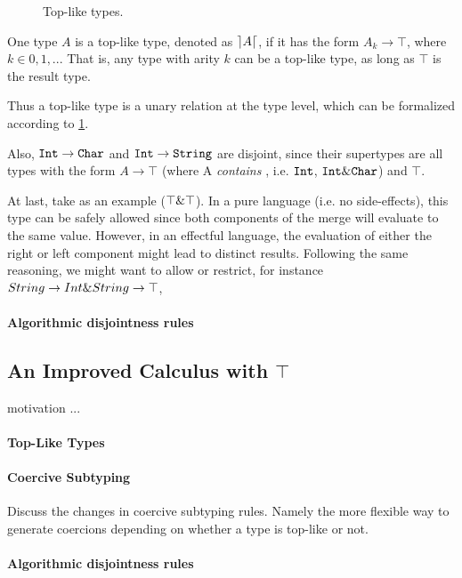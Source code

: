 \begin{figure}[t]
  \caption{Top-like types.}
  \label{fig:fi-toplike}
\end{figure}

\begin{definition}
  
  One type $A$ is a top-like type, denoted as $\rceil A \lceil$, if it has the form $A_k \to \top$, where $k \in {0,1,..}$.
  That is, any type with arity $k$ can be a top-like type, as long as $\top$ is the result type. 

\end{definition}
Thus a top-like type is a unary relation at the type level, which can be formalized according to \ref{fig:fi-toplike}.

Also, $\texttt{Int} \to \texttt{Char}$ and $\texttt{Int} \to \texttt{String}$ are disjoint, 
since their supertypes are all types with the form $A \to \top$ 
(where A \emph{contains} , i.e. $\texttt{Int}$, $\texttt{Int} \& \texttt{Char}$) and $\top$.


At last, take as an example ($\top \& \top$).
In a pure language (i.e. no side-effects), this type can be safely allowed since both components of the merge
will evaluate to the same value. 
However, in an effectful language, the evaluation of either the right or left component might lead to distinct results. 
Following the same reasoning, we might want to allow or restrict, for instance $String \to Int \& String \to \top$,  

\paragraph{Algorithmic disjointness rules}

\subsection{An Improved Calculus with $\top$}

motivation ...

\paragraph{Top-Like Types}

\paragraph{Coercive Subtyping} Discuss the changes in 
coercive subtyping rules. Namely the more flexible way to 
generate coercions depending on whether a type is top-like 
or not. 

\paragraph{Algorithmic disjointness rules}